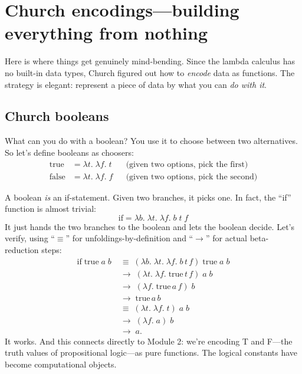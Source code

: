 \documentclass[11pt]{article}
\begin{document}
\section{Church encodings---building everything from nothing}

Here is where things get genuinely mind-bending. Since the lambda calculus has no built-in data types, Church figured out how to \emph{encode} data as functions. The strategy is elegant: represent a piece of data by what you can \emph{do with it}.

\subsection*{Church booleans}

What can you do with a boolean? You use it to choose between two alternatives. So let's define booleans as choosers:
\begin{align*}
\text{true}  &= \lambda t.\; \lambda f.\; t  && \text{(given two options, pick the first)} \\
\text{false} &= \lambda t.\; \lambda f.\; f  && \text{(given two options, pick the second)}
\end{align*}

A boolean \emph{is} an if-statement. Given two branches, it picks one. In fact, the ``if'' function is almost trivial:
\[
\text{if} = \lambda b.\; \lambda t.\; \lambda f.\; b\; t\; f
\]
It just hands the two branches to the boolean and lets the boolean decide. Let's verify, using ``$\equiv$'' for unfoldings-by-definition and ``$\longrightarrow$'' for actual beta-reduction steps:
\begin{align*}
  \text{if}\;\text{true}\;a\;b
    &\;\equiv\; (\lambda b.\;\lambda t.\;\lambda f.\; b\, t\, f)\;\text{true}\;a\;b \\
    &\;\longrightarrow\; (\lambda t.\;\lambda f.\; \text{true}\, t\, f)\;a\;b \\
    &\;\longrightarrow\; (\lambda f.\; \text{true}\, a\, f)\;b \\
    &\;\longrightarrow\; \text{true}\, a\, b \\
    &\;\equiv\; (\lambda t.\;\lambda f.\; t)\; a\; b \\
    &\;\longrightarrow\; (\lambda f.\; a)\; b \\
    &\;\longrightarrow\; a.
\end{align*}
It works. And this connects directly to Module 2: we're encoding T and F---the truth values of propositional logic---as pure functions. The logical constants have become computational objects.
\end{document}
